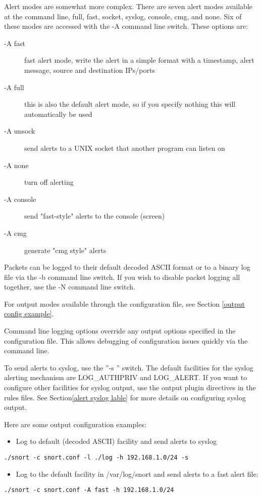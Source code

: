 \documentclass[english]{report}
\newenvironment{note}{
    \vspace{10pt}{\textsf{
        {\Huge{$\triangle$\hspace{-12.5pt}{\Large{$^!$}}}}\hspace{5pt}
        {\Large{NOTE}}
    }
    }

    \begin{center}
    \par\vspace{-10pt}
    \begin{lrbox}{\savepar}
    \begin{minipage}[r]{6.2in}
}
{
    \end{minipage}
    \end{lrbox}
    \fbox{
        \usebox{
            \savepar
        }
    }
    \par\vskip10pt
    \end{center}
}
\begin{document}
Alert modes are somewhat more complex. There are seven alert modes available
at the command line, full, fast, socket, syslog, console, cmg, and
none. Six of these modes are accessed with the -A command line switch.
These options are:

\begin{description}
\item [-A fast]fast alert mode, write the alert in a simple format with a timestamp, alert message, source and destination IPs/ports
\item [-A full]this is also the default alert mode, so if you specify nothing this will automatically be used 
\item [-A unsock]send alerts to a UNIX socket that another program can listen on
\item [-A none]turn off alerting
\item [-A console]send "fast-style" alerts to the console (screen)
\item [-A cmg]generate "cmg style" alerts
\end{description}
Packets can be logged to their default decoded ASCII format or to
a binary log file via the -b command line switch. If you wish to disable
packet logging all together, use the -N command line switch.

For output modes available through the configuration file, see Section
\ref{output config example}. 

\begin{note}
Command line logging options override any output options specified in the
configuration file. This allows debugging of configuration issues quickly via
the command line.
\end{note}

To send alerts to syslog, use the ''-s '' switch. The default facilities
for the syslog alerting mechanism are LOG\_AUTHPRIV and LOG\_ALERT.
If you want to configure other facilities for syslog output, use the
output plugin directives in the rules files. See Section\ref{alert syslog lable}
for more details on configuring syslog output.

Here are some output configuration examples:

\begin{itemize}
\item Log to default (decoded ASCII) facility and send alerts to syslog 
\end{itemize}
\begin{verbatim}
./snort -c snort.conf -l ./log -h 192.168.1.0/24 -s
\end{verbatim}
\begin{itemize}
\item Log to the default facility in /var/log/snort and send alerts to a
fast alert file: 
\end{itemize}
\begin{verbatim}
./snort -c snort.conf -A fast -h 192.168.1.0/24
\end{verbatim}
\end{document}
